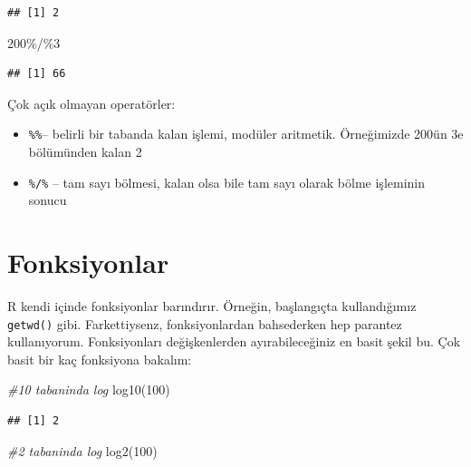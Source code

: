 \documentclass[
]{book}
\newenvironment{Shaded}{\begin{snugshade}}{\end{snugshade}}
\newcommand{\CommentTok}[1]{\textcolor[rgb]{0.56,0.35,0.01}{\textit{#1}}}
\newcommand{\DecValTok}[1]{\textcolor[rgb]{0.00,0.00,0.81}{#1}}
\newcommand{\FunctionTok}[1]{\textcolor[rgb]{0.00,0.00,0.00}{#1}}
\newcommand{\NormalTok}[1]{#1}
\newcommand{\SpecialCharTok}[1]{\textcolor[rgb]{0.00,0.00,0.00}{#1}}
\providecommand{\tightlist}{%
  \setlength{\itemsep}{0pt}\setlength{\parskip}{0pt}}
\begin{document}
\begin{verbatim}
## [1] 2
\end{verbatim}

\begin{Shaded}
\begin{Highlighting}[]
\DecValTok{200}\SpecialCharTok{\%/\%}\DecValTok{3}
\end{Highlighting}
\end{Shaded}

\begin{verbatim}
## [1] 66
\end{verbatim}

Çok açık olmayan operatörler:

\begin{itemize}
\tightlist
\item
  \texttt{\%\%}-- belirli bir tabanda kalan işlemi, modüler aritmetik. Örneğimizde 200ün 3e bölümünden kalan 2
\item
  \texttt{\%/\%} -- tam sayı bölmesi, kalan olsa bile tam sayı olarak bölme işleminin sonucu
\end{itemize}

\hypertarget{fonksiyonlar}{%
\section{Fonksiyonlar}\label{fonksiyonlar}}

R kendi içinde fonksiyonlar barındırır. Örneğin, başlangıçta kullandığımız \texttt{getwd()} gibi. Farkettiysenz, fonksiyonlardan bahsederken hep parantez kullanıyorum. Fonksiyonları değişkenlerden ayırabileceğiniz en basit şekil bu. Çok basit bir kaç fonksiyona bakalım:

\begin{Shaded}
\begin{Highlighting}[]
\CommentTok{\#10 tabaninda log}
\FunctionTok{log10}\NormalTok{(}\DecValTok{100}\NormalTok{) }
\end{Highlighting}
\end{Shaded}

\begin{verbatim}
## [1] 2
\end{verbatim}

\begin{Shaded}
\begin{Highlighting}[]
\CommentTok{\#2 tabaninda log}
\FunctionTok{log2}\NormalTok{(}\DecValTok{100}\NormalTok{)}
\end{Highlighting}
\end{Shaded}
\end{document}
